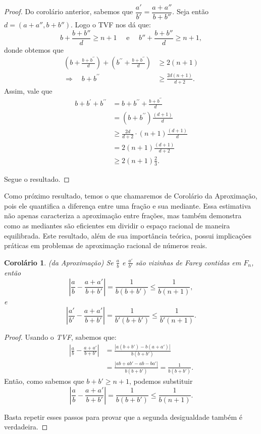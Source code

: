 \documentclass{hipatia}
\newtheorem*{corollary*}{Corolário} %
\theoremstyle{definition} %
\begin{document}
\begin{proof}
    Do corolário anterior, sabemos que $\dfrac{a'}{b'} = \dfrac{a + a''}{b + b''}$. Seja então $d=(a+a'',b+b'')$. Logo o TVF nos dá que:
    $$
    b+\frac{b+b''}{d}\geq n+1\quad \text{ e } \quad b''+\frac{b+b''}{d}\geq n+1,
    $$
\noindent donde obtemos que 
$$
\begin{aligned}
\left(b+\frac{b+b^{\prime \prime}}{d}\right)+\left(b^{\prime \prime}+\frac{b+b^{\prime \prime}}{d}\right) & \geqslant 2(n+1) \\
\Rightarrow \quad b+b^{\prime \prime} & \geqslant \frac{2 d(n+1)}{d+2}.
\end{aligned}
$$
Assim, vale que 
$$
\begin{aligned}
b+b^{\prime}+b^{\prime \prime} & =b+b^{\prime \prime}+\frac{b+b^{\prime \prime}}{d} \\
& =\left(b+b^{\prime \prime}\right) \frac{(d+1)}{d} \\
& \geqslant \frac{2 d}{d+2} \cdot(n+1) \frac{(d+1)}{d} \\
& =2(n+1) \frac{(d+1)}{d+2}\\
&\geq 2(n+1) \frac{2}{3}.
\end{aligned}
$$

Segue o resultado.
    
\end{proof}


Como próximo resultado, temos o que chamaremos de Corolário da Aproximação, pois ele quantifica a diferença entre uma fração e sua mediante. Essa estimativa não apenas caracteriza a aproximação entre frações, mas também demonstra como as mediantes são eficientes em dividir o espaço racional de maneira equilibrada. Este resultado, além de sua importância teórica, possui implicações práticas em problemas de aproximação racional de números reais.

\begin{corollary*} (da Aproximação)
Se \(\frac{a}{b}\) e \(\frac{a'}{b'}\) são vizinhas de Farey contidas em \(F_n\), então
\[
\left| \frac{a}{b} - \frac{a + a'}{b + b'} \right| = \frac{1}{b(b + b')} \leq \frac{1}{b(n + 1)},
\]
e
\[
\left| \frac{a'}{b'} - \frac{a + a'}{b + b'} \right| = \frac{1}{b'(b + b')} \leq \frac{1}{b'(n + 1)}.
\]
\end{corollary*}



\begin{proof}
Usando o \textit{TVF}, sabemos que:
\begin{align*}
\left| \frac{a}{b} - \frac{a + a'}{b + b'} \right| &= \frac{|a(b + b') - b(a + a')|}{b(b + b')} \\
&= \frac{|ab + ab' - ab - ba'|}{b(b + b')} = \frac{1}{b(b + b')}.
\end{align*}
Então, como sabemos que \(b + b' \geq n + 1\), podemos substituir
\[
\left| \frac{a}{b} - \frac{a + a'}{b + b'} \right| = \frac{1}{b(b + b')} \leq \frac{1}{b(n + 1)}.
\]

Basta repetir esses passos para provar que a segunda desigualdade também é verdadeira.
\end{proof}
\end{document}

